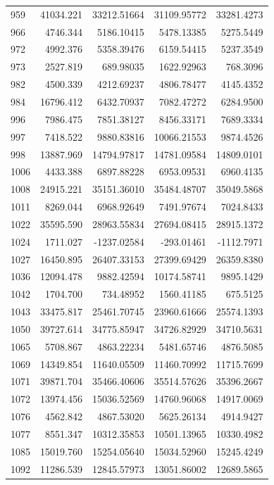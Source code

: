\documentclass[
  12pt,
]{article}
\begin{document}
\begin{longtable}[]{@{}lrrrr@{}}
959 & 41034.221 & 33212.51664 & 31109.95772 & 33281.4273 \\
966 & 4746.344 & 5186.10415 & 5478.13385 & 5275.5449 \\
972 & 4992.376 & 5358.39476 & 6159.54415 & 5237.3549 \\
973 & 2527.819 & 689.98035 & 1622.92963 & 768.3096 \\
982 & 4500.339 & 4212.69237 & 4806.78477 & 4145.4352 \\
984 & 16796.412 & 6432.70937 & 7082.47272 & 6284.9500 \\
996 & 7986.475 & 7851.38127 & 8456.33171 & 7689.3334 \\
997 & 7418.522 & 9880.83816 & 10066.21553 & 9874.4526 \\
998 & 13887.969 & 14794.97817 & 14781.09584 & 14809.0101 \\
1006 & 4433.388 & 6897.88228 & 6953.09531 & 6960.4135 \\
1008 & 24915.221 & 35151.36010 & 35484.48707 & 35049.5868 \\
1011 & 8269.044 & 6968.92649 & 7491.97674 & 7024.8433 \\
1022 & 35595.590 & 28963.55834 & 27694.08415 & 28915.1372 \\
1024 & 1711.027 & -1237.02584 & -293.01461 & -1112.7971 \\
1027 & 16450.895 & 26407.33153 & 27399.69429 & 26359.8380 \\
1036 & 12094.478 & 9882.42594 & 10174.58741 & 9895.1429 \\
1042 & 1704.700 & 734.48952 & 1560.41185 & 675.5125 \\
1043 & 33475.817 & 25461.70745 & 23960.61666 & 25574.1393 \\
1050 & 39727.614 & 34775.85947 & 34726.82929 & 34710.5631 \\
1065 & 5708.867 & 4863.22234 & 5481.65746 & 4876.5085 \\
1069 & 14349.854 & 11640.05509 & 11460.70992 & 11715.7699 \\
1071 & 39871.704 & 35466.40606 & 35514.57626 & 35396.2667 \\
1072 & 13974.456 & 15036.52569 & 14760.96068 & 14917.0069 \\
1076 & 4562.842 & 4867.53020 & 5625.26134 & 4914.9427 \\
1077 & 8551.347 & 10312.35853 & 10501.13965 & 10330.4982 \\
1085 & 15019.760 & 15254.05640 & 15034.52960 & 15245.4249 \\
1092 & 11286.539 & 12845.57973 & 13051.86002 & 12689.5865 \\

\end{longtable}
\end{document}
